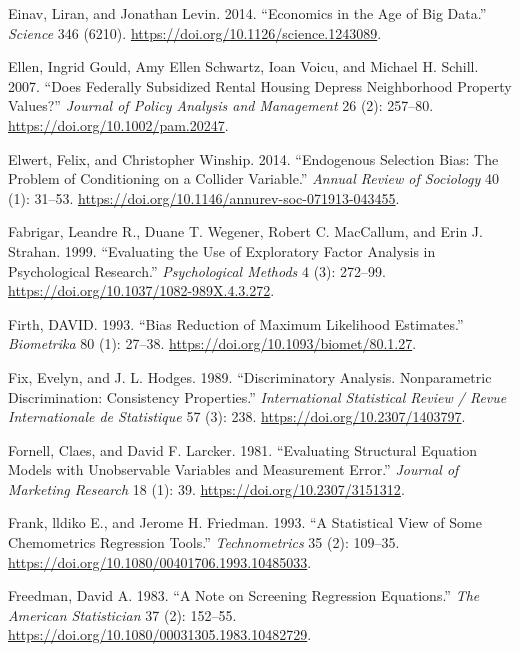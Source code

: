 \documentclass[
  letterpaper,
  10pt,
  twoside,
  openright,
  numbers=noenddot,
  chapterprefix=true]{scrbook}
\newlength{\cslhangindent}
\newenvironment{CSLReferences}[2] %
 {\begin{list}{}{%
  \setlength{\itemindent}{0pt}
  \setlength{\leftmargin}{0pt}
  \setlength{\parsep}{0pt}
  \ifodd #1
   \setlength{\leftmargin}{\cslhangindent}
   \setlength{\itemindent}{-1\cslhangindent}
  \fi
  \setlength{\itemsep}{#2\baselineskip}}}
 {\end{list}}
\begin{document}
\begin{CSLReferences}{1}{0}
Einav, Liran, and Jonathan Levin. 2014. {``{Economics} in the Age of Big
Data.''} \emph{{Science}} 346 (6210).
\url{https://doi.org/10.1126/science.1243089}.

Ellen, Ingrid Gould, Amy Ellen Schwartz, Ioan Voicu, and Michael H.
Schill. 2007. {``{Does} Federally Subsidized Rental Housing Depress
Neighborhood Property Values?''} \emph{{Journal} of {Policy} {Analysis}
and {Management}} 26 (2): 257--80.
\url{https://doi.org/10.1002/pam.20247}.

Elwert, Felix, and Christopher Winship. 2014. {``{Endogenous}
{Selection} {Bias}: {The} {Problem} of {Conditioning} on a {Collider}
{Variable}.''} \emph{{Annual} {Review} of {Sociology}} 40 (1): 31--53.
\url{https://doi.org/10.1146/annurev-soc-071913-043455}.

Fabrigar, Leandre R., Duane T. Wegener, Robert C. MacCallum, and Erin J.
Strahan. 1999. {``{Evaluating} the Use of Exploratory Factor Analysis in
Psychological Research.''} \emph{{Psychological} {Methods}} 4 (3):
272--99. \url{https://doi.org/10.1037/1082-989X.4.3.272}.

Firth, DAVID. 1993. {``{Bias} Reduction of Maximum Likelihood
Estimates.''} \emph{{Biometrika}} 80 (1): 27--38.
\url{https://doi.org/10.1093/biomet/80.1.27}.

Fix, Evelyn, and J. L. Hodges. 1989. {``{Discriminatory} {Analysis}.
{Nonparametric} {Discrimination}: {Consistency} {Properties}.''}
\emph{{International} {Statistical} {Review} / {Revue} {Internationale}
de {Statistique}} 57 (3): 238. \url{https://doi.org/10.2307/1403797}.

Fornell, Claes, and David F. Larcker. 1981. {``{Evaluating} {Structural}
{Equation} {Models} with {Unobservable} {Variables} and {Measurement}
{Error}.''} \emph{{Journal} of {Marketing} {Research}} 18 (1): 39.
\url{https://doi.org/10.2307/3151312}.

Frank, lldiko E., and Jerome H. Friedman. 1993. {``A {Statistical}
{View} of {Some} {Chemometrics} {Regression} {Tools}.''}
\emph{{Technometrics}} 35 (2): 109--35.
\url{https://doi.org/10.1080/00401706.1993.10485033}.

Freedman, David A. 1983. {``A {Note} on {Screening} {Regression}
{Equations}.''} \emph{{The} {American} {Statistician}} 37 (2): 152--55.
\url{https://doi.org/10.1080/00031305.1983.10482729}.


\end{CSLReferences}
\end{document}
